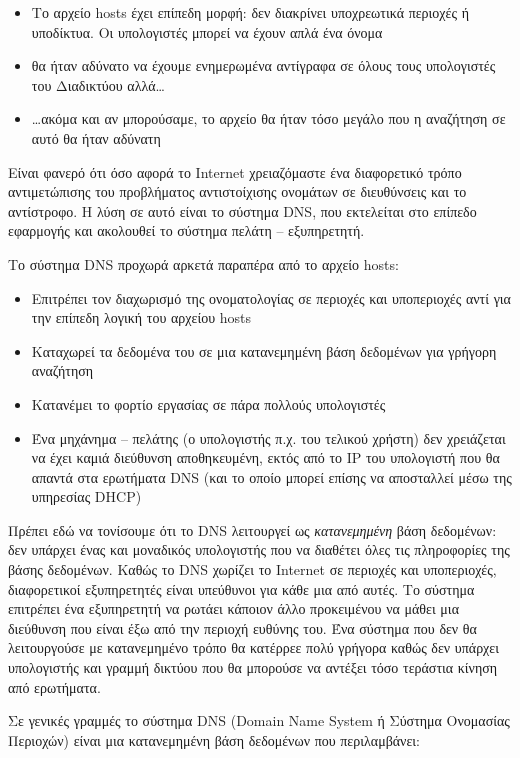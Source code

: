 \begin{itemize}
\item Το αρχείο hosts έχει επίπεδη μορφή: δεν διακρίνει υποχρεωτικά περιοχές ή υποδίκτυα. Οι υπολογιστές μπορεί να έχουν απλά ένα όνομα
\item θα ήταν αδύνατο να έχουμε ενημερωμένα αντίγραφα σε όλους τους υπολογιστές του Διαδικτύου αλλά\ldots
\item \ldots{}ακόμα και αν μπορούσαμε, το αρχείο θα ήταν τόσο μεγάλο που η αναζήτηση σε αυτό θα ήταν αδύνατη
\end{itemize}

Είναι φανερό ότι όσο αφορά το Internet χρειαζόμαστε ένα διαφορετικό τρόπο αντιμετώπισης του προβλήματος αντιστοίχισης ονομάτων σε διευθύνσεις και το αντίστροφο. Η λύση σε αυτό είναι το σύστημα DNS, που εκτελείται στο επίπεδο εφαρμογής και ακολουθεί το σύστημα πελάτη -- εξυπηρετητή.

Το σύστημα DNS προχωρά αρκετά παραπέρα από το αρχείο hosts:

\begin{itemize}
\item Επιτρέπει τον διαχωρισμό της ονοματολογίας σε περιοχές και υποπεριοχές αντί για την επίπεδη λογική του αρχείου hosts
\item Καταχωρεί τα δεδομένα του σε μια κατανεμημένη βάση δεδομένων για γρήγορη αναζήτηση
\item Κατανέμει το φορτίο εργασίας σε πάρα πολλούς υπολογιστές
\item Ένα μηχάνημα -- πελάτης (ο υπολογιστής π.χ. του τελικού χρήστη) δεν χρειάζεται να έχει καμιά διεύθυνση αποθηκευμένη, εκτός από το IP του υπολογιστή που θα απαντά στα ερωτήματα DNS (και το οποίο μπορεί επίσης να αποσταλλεί μέσω της υπηρεσίας DHCP)
\end{itemize}

Πρέπει εδώ να τονίσουμε ότι το DNS λειτουργεί ως \emph{κατανεμημένη} βάση δεδομένων: δεν υπάρχει ένας και μοναδικός υπολογιστής που να διαθέτει όλες τις πληροφορίες της βάσης δεδομένων. Καθώς το DNS χωρίζει το Internet σε περιοχές και υποπεριοχές, διαφορετικοί εξυπηρετητές είναι υπεύθυνοι για κάθε μια από αυτές. Το σύστημα επιτρέπει ένα εξυπηρετητή να ρωτάει κάποιον άλλο προκειμένου να μάθει μια διεύθυνση που είναι έξω από την περιοχή ευθύνης του. Ένα σύστημα που δεν θα λειτουργούσε με κατανεμημένο τρόπο θα κατέρρεε πολύ γρήγορα καθώς δεν υπάρχει υπολογιστής και γραμμή δικτύου που θα μπορούσε να αντέξει τόσο τεράστια κίνηση από ερωτήματα.

Σε γενικές γραμμές το σύστημα DNS (Domain Name System ή Σύστημα Ονομασίας Περιοχών) είναι μια κατανεμημένη βάση δεδομένων που περιλαμβάνει:

